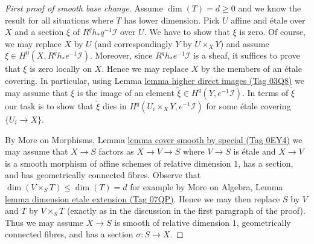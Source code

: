\documentclass{amsart}
\theoremstyle{plain}
\theoremstyle{definition}
\theoremstyle{remark}
\numberwithin{equation}{subsection}
\begin{document}
\begin{proof}[First proof of smooth base change]
\medskip\noindent
Assume $\dim(T) = d \geq 0$ and we know the result for all situations where $T$
has lower dimension. Pick $U$ affine and \'etale over $X$ and a section $\xi$
of $R^qh_*q^{-1}\mathcal{I}$ over $U$. We have to show
that $\xi$ is zero. Of course, we may replace $X$ by $U$
(and correspondingly $Y$ by $U \times_X Y$)
and assume $\xi \in H^0(X, R^qh_*e^{-1}\mathcal{I})$.
Moreover, since $R^qh_*e^{-1}\mathcal{I}$ is a sheaf,
it suffices to prove that $\xi$ is zero locally on $X$.
Hence we may replace $X$ by the members of an \'etale covering.
In particular, using Lemma \href{https://stacks.math.columbia.edu/tag/03Q8}{lemma higher direct images (Tag 03Q8)}
we may assume that $\xi$ is the image of an element
$\tilde \xi \in H^q(Y, e^{-1}\mathcal{I})$.
In terms of $\tilde \xi$ our task is to show that
$\tilde \xi$ dies in $H^q(U_i \times_X Y, e^{-1}\mathcal{I})$
for some \'etale covering $\{U_i \to X\}$.

\medskip\noindent
By More on Morphisms, Lemma \href{https://stacks.math.columbia.edu/tag/0EY4}{lemma cover smooth by special (Tag 0EY4)}
we may assume that $X \to S$ factors as $X \to V \to S$
where $V \to S$ is \'etale and $X \to V$ is a smooth morphism
of affine schemes of relative dimension $1$, has a section, and
has geometrically connected fibres. Observe that
$\dim(V \times_S T) \leq \dim(T) = d$
for example by More on Algebra, Lemma
\href{https://stacks.math.columbia.edu/tag/07QP}{lemma dimension etale extension (Tag 07QP)}.
Hence we may then replace $S$ by $V$ and $T$ by $V \times_S T$
(exactly as in the discussion in the first paragraph of the proof).
Thus we may assume $X \to S$ is smooth of relative dimension $1$,
geometrically connected fibres, and has a section $\sigma : S \to X$.


\end{proof}
\end{document}
